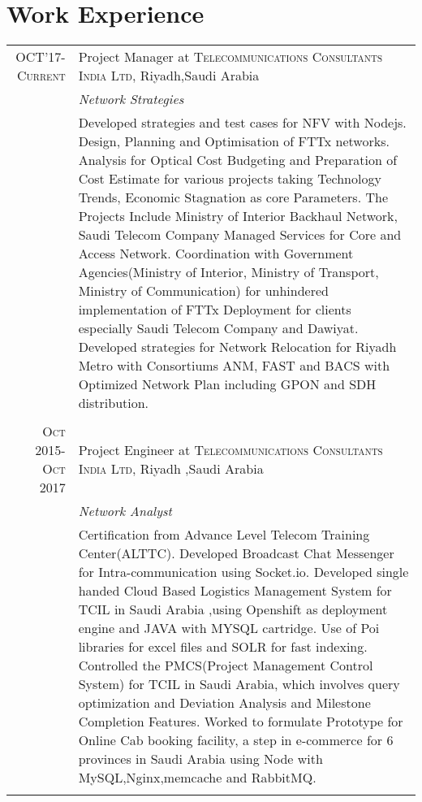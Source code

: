 \documentclass[a4paper,10pt]{article}
\begin{document}
\section{Work Experience}
\begin{tabular}{r|p{11cm}}
 \textsc{OCT'17-Current} & Project Manager at \textsc{Telecommunications Consultants India Ltd}, Riyadh,Saudi Arabia \\ &\emph{Network Strategies}\\&\footnotesize{Developed strategies and test cases for NFV with Nodejs.\newline 
 Design, Planning and Optimisation of FTTx networks.\newline
 Analysis for Optical Cost Budgeting and Preparation of Cost Estimate for various projects taking Technology Trends, Economic Stagnation as core Parameters. The Projects Include Ministry of Interior Backhaul Network, Saudi Telecom Company Managed Services for Core and Access Network.\newline 
 Coordination with Government Agencies(Ministry of Interior, Ministry of Transport, Ministry of Communication) for unhindered implementation of FTTx Deployment for clients especially Saudi Telecom Company and Dawiyat.\newline
 Developed strategies for Network Relocation for Riyadh Metro with Consortiums ANM, FAST and BACS with Optimized Network Plan including GPON and SDH distribution.\newline
}\\\multicolumn{2}{c}{} \\
 \textsc{Oct 2015- Oct 2017} & Project Engineer at \textsc{Telecommunications Consultants India Ltd}, Riyadh ,Saudi Arabia \\&\emph{Network Analyst}\\&\footnotesize{ Certification from Advance Level Telecom Training Center(ALTTC).\newline
 Developed Broadcast Chat Messenger for Intra-communication using Socket.io.\newline
Developed single handed Cloud Based Logistics Management System for TCIL in Saudi Arabia ,using Openshift as deployment engine and JAVA with MYSQL cartridge. Use of Poi libraries for excel files and SOLR for fast indexing.\newline
Controlled the PMCS(Project Management Control System) for TCIL in Saudi Arabia, which involves query optimization and Deviation Analysis and Milestone Completion Features.\newline
 Worked to formulate Prototype for Online Cab booking facility, a step in e-commerce for 6 provinces in Saudi Arabia using Node with MySQL,Nginx,memcache and RabbitMQ.}\\\multicolumn{2}{c}{} \\

\end{tabular}
\end{document}
